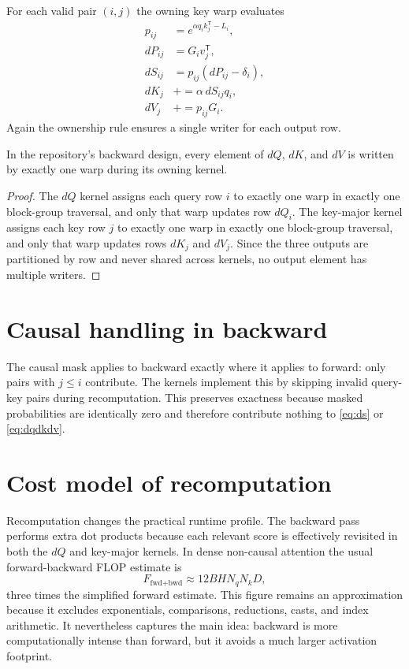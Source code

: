For each valid pair $(i,j)$ the owning key warp evaluates
\begin{align}
  p_{ij} &= e^{\alpha q_i k_j^{\mathsf T} - L_i}, \\
  dP_{ij} &= G_i v_j^{\mathsf T}, \\
  dS_{ij} &= p_{ij}(dP_{ij} - \delta_i), \\
  dK_j &\mathrel{+}= \alpha\, dS_{ij} q_i, \\
  dV_j &\mathrel{+}= p_{ij} G_i.
\end{align}
Again the ownership rule ensures a single writer for each output row.

\begin{proposition}
In the repository's backward design, every element of $dQ$, $dK$, and $dV$ is written by exactly one warp during its owning kernel.
\end{proposition}

\begin{proof}
The $dQ$ kernel assigns each query row $i$ to exactly one warp in exactly one block-group traversal, and only that warp updates row $dQ_i$. The key-major kernel assigns each key row $j$ to exactly one warp in exactly one block-group traversal, and only that warp updates rows $dK_j$ and $dV_j$. Since the three outputs are partitioned by row and never shared across kernels, no output element has multiple writers.
\end{proof}

\section{Causal handling in backward}

The causal mask applies to backward exactly where it applies to forward: only pairs with $j\le i$ contribute. The kernels implement this by skipping invalid query-key pairs during recomputation. This preserves exactness because masked probabilities are identically zero and therefore contribute nothing to \eqref{eq:ds} or \eqref{eq:dqdkdv}.

\section{Cost model of recomputation}

Recomputation changes the practical runtime profile. The backward pass performs extra dot products because each relevant score is effectively revisited in both the $dQ$ and key-major kernels. In dense non-causal attention the usual forward-backward FLOP estimate is
\begin{equation}
  F_{\text{fwd+bwd}} \approx 12BHN_qN_kD,
\end{equation}
three times the simplified forward estimate. This figure remains an approximation because it excludes exponentials, comparisons, reductions, casts, and index arithmetic. It nevertheless captures the main idea: backward is more computationally intense than forward, but it avoids a much larger activation footprint.

